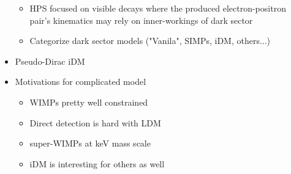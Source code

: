 \begin{itemize}
\begin{itemize}
              \item HPS focused on visible decays where the produced electron-positron pair's kinematics may rely on inner-workings of dark sector
              \item Categorize dark sector models ("Vanila", SIMPs, iDM, others...)
          \end{itemize}
    \item Pseudo-Dirac iDM
    \item Motivations for complicated model
          \begin{itemize}
              \item WIMPs pretty well constrained \cite{supercdms-2018,damic-2020,xenon1t-2018}
              \item Direct detection is hard with LDM \cite{ldmconstraints-2019}
              \item super-WIMPs at keV mass scale \cite{superwimps-2008}
              \item iDM is interesting for others as well \cite{darkseaquest-2018}
          \end{itemize}
\end{itemize}

